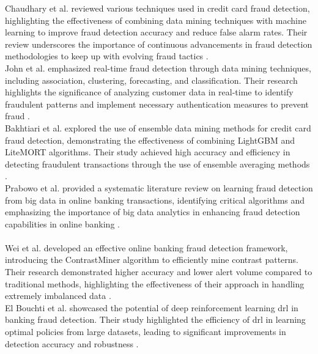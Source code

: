 \documentclass[12pt,a4paper]{report}
\begin{document}
Chaudhary et al. reviewed various techniques used in credit card fraud detection, highlighting the effectiveness of combining data mining techniques with machine learning to improve fraud detection accuracy and reduce false alarm rates. Their review underscores the importance of continuous advancements in fraud detection methodologies to keep up with evolving fraud tactics \citep[p. 39]{chaudhary2012review}.\\

John et al. emphasized real-time fraud detection through data mining techniques, including association, clustering, forecasting, and classification. Their research highlights the significance of analyzing customer data in real-time to identify fraudulent patterns and implement necessary authentication measures to prevent fraud \citep[p. 1186]{john2016realtime}.\\

Bakhtiari et al. explored the use of ensemble data mining methods for credit card fraud detection, demonstrating the effectiveness of combining LightGBM and LiteMORT algorithms. Their study achieved high accuracy and efficiency in detecting fraudulent transactions through the use of ensemble averaging methods \citep[p. 29057]{bakhtiari2023credit}.\\

Prabowo et al. provided a systematic literature review on learning fraud detection from big data in online banking transactions, identifying critical algorithms and emphasizing the importance of big data analytics in enhancing fraud detection capabilities in online banking \citep[p. 127]{prabowo2016learning}.\\
\\

Wei et al. developed an effective online banking fraud detection framework, introducing the ContrastMiner algorithm to efficiently mine contrast patterns. Their research demonstrated higher accuracy and lower alert volume compared to traditional methods, highlighting the effectiveness of their approach in handling extremely imbalanced data \citep[p. 449]{wei2013effective}.\\

El Bouchti et al. showcased the potential of deep reinforcement learning \acrshort{drl} in banking fraud detection. Their study highlighted the efficiency of \acrshort{drl} in learning optimal policies from large datasets, leading to significant improvements in detection accuracy and robustness \citep[p. 58]{el2017fraud}.\\
\end{document}
